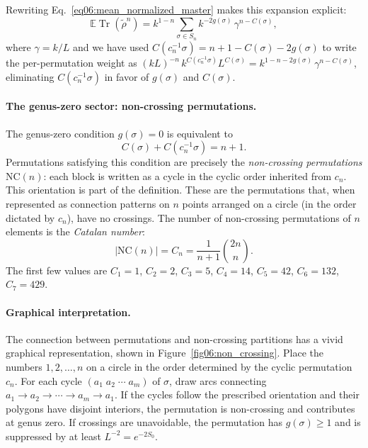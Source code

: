 \documentclass[11pt,letterpaper]{article}
\theoremstyle{plain}
\theoremstyle{definition}
\theoremstyle{remark}
\begin{document}
Rewriting Eq.~\eqref{eq06:mean_normalized_master} makes this expansion explicit:
\begin{equation}
\label{eq06:genus_expansion}
\mathbb E\operatorname{Tr}(\widetilde\rho^n) = k^{1-n}
  \sum_{\sigma \in S_n} k^{-2g(\sigma)} \, \gamma^{n - C(\sigma)},
\end{equation}
where $\gamma = k/L$ and we have used
$C(c_n^{-1}\sigma) = n + 1 - C(\sigma) - 2g(\sigma)$ to write the
per-permutation weight as
$(kL)^{-n}\, k^{C(c_n^{-1}\sigma)} L^{C(\sigma)}
= k^{1-n-2g(\sigma)}\,\gamma^{n - C(\sigma)}$, eliminating
$C(c_n^{-1}\sigma)$ in favor of $g(\sigma)$ and $C(\sigma)$.

\paragraph{The genus-zero sector: non-crossing permutations.}
The genus-zero condition $g(\sigma) = 0$ is equivalent to
\begin{equation}
\label{eq06:genus_zero_condition}
C(\sigma) + C(c_n^{-1}\sigma) = n + 1.
\end{equation}
Permutations satisfying this condition are precisely the \emph{non-crossing
permutations} $\mathrm{NC}(n)$: each block is written as a cycle in the
cyclic order inherited from $c_n$.  This orientation is part of the definition.
These are the permutations that, when
represented as connection patterns on $n$ points arranged on a circle
(in the order dictated by $c_n$), have no crossings.  The number of
non-crossing permutations of $n$ elements is the \emph{Catalan
number}:
\begin{equation}
\label{eq06:catalan_number}
|\mathrm{NC}(n)| = C_n = \frac{1}{n+1}\binom{2n}{n}.
\end{equation}
The first few values are $C_1 = 1$, $C_2 = 2$, $C_3 = 5$, $C_4 = 14$,
$C_5 = 42$, $C_6 = 132$, $C_7 = 429$.

\paragraph{Graphical interpretation.}
The connection between permutations and non-crossing partitions has a vivid
graphical representation, shown in Figure~\ref{fig06:non_crossing}.  Place
the numbers $1, 2, \ldots, n$ on a circle in the order determined by the
cyclic permutation $c_n$.  For each cycle $(a_1\; a_2\; \cdots\; a_m)$ of
$\sigma$, draw arcs connecting $a_1 \to a_2 \to \cdots \to a_m \to a_1$.  If the cycles follow the prescribed orientation and
their polygons have disjoint interiors, the permutation
is non-crossing and contributes at genus zero.  If crossings are unavoidable,
the permutation has $g(\sigma) \geq 1$ and is suppressed by at least
$L^{-2} = e^{-2S_0}$.
\end{document}
